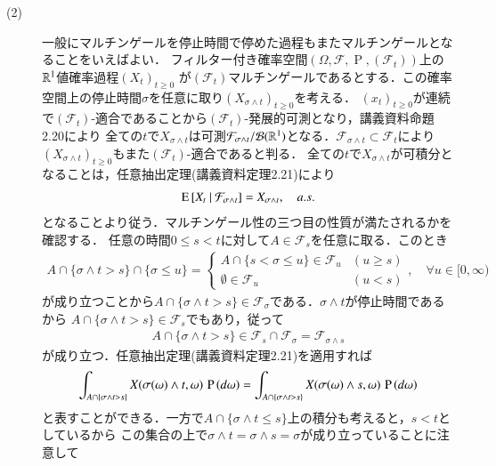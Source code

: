 \begin{prf}
\begin{description}
	\item[(2)] 一般にマルチンゲールを停止時間で停めた過程もまたマルチンゲールとなることをいえばよい．
		フィルター付き確率空間$(\Omega, \mathcal{F}, \operatorname{P}, (\mathcal{F}_t))$上の$\mathbb{R}^1$値確率過程$(X_t)_{t \geq 0}$
		が$(\mathcal{F}_t)$マルチンゲールであるとする．この確率空間上の停止時間$\sigma$を任意に取り$(X_{\sigma \wedge t})_{t \geq 0}$を考える．
		$(x_t)_{t \geq 0}$が連続で$(\mathcal{F}_t)$-適合であることから$(\mathcal{F}_t)$-発展的可測となり，講義資料命題2.20により
		全ての$t$で$X_{\sigma \wedge t}$は可測$\mathcal{F}_{\sigma \wedge t}/\mathcal{B}(\mathbb{R}^1)$となる．$\mathcal{F}_{\sigma \wedge t}
		\subset \mathcal{F}_t$により$(X_{\sigma \wedge t})_{t \geq 0}$もまた$(\mathcal{F}_t)$-適合であると判る．
		全ての$t$で$X_{\sigma \wedge t}$が可積分となることは，任意抽出定理(講義資料定理2.21)により
		\begin{align}
			\operatorname{E} \left[ X_t\ |\ \mathcal{F}_{\sigma \wedge t} \right] = X_{\sigma \wedge t}, \quad a.s.
		\end{align}
		となることより従う．マルチンゲール性の三つ目の性質が満たされるかを確認する．
		任意の時間$0 \leq s < t$に対して$A \in \mathcal{F}_s$を任意に取る．このとき
		\begin{align}
			A \cap \{ \sigma \wedge t > s \} \cap \{\sigma \leq u\} = \begin{cases}
				A \cap \{s < \sigma \leq u\} \in \mathcal{F}_u & (u \geq s) \\
				\emptyset \in \mathcal{F}_u & (u < s)
			\end{cases}, \quad \forall u \in [0,\infty)
		\end{align}
		が成り立つことから$A \cap \{ \sigma \wedge t > s \} \in \mathcal{F}_{\sigma}$である．$\sigma \wedge t$が停止時間であるから
		$A \cap \{ \sigma \wedge t > s \} \in \mathcal{F}_s$でもあり，従って
		\begin{align}
			A \cap \{ \sigma \wedge t > s \} \in \mathcal{F}_s \cap \mathcal{F}_{\sigma} = \mathcal{F}_{\sigma \wedge s}
		\end{align}
		が成り立つ．任意抽出定理(講義資料定理2.21)を適用すれば
		\begin{align}
			\int_{A \cap \{ \sigma \wedge t > s \}} X(\sigma(\omega) \wedge t, \omega)\, \operatorname{P} \left(d\omega\right)
			= \int_{A \cap \{ \sigma \wedge t > s \}} X(\sigma(\omega) \wedge s, \omega)\, \operatorname{P} \left(d\omega\right)
		\end{align}
		と表すことができる．一方で$A \cap \{ \sigma \wedge t \leq s \}$上の積分も考えると，$s < t$としているから
		この集合の上で$\sigma \wedge t = \sigma \wedge s = \sigma$が成り立っていることに注意して

\end{description}
\end{prf}
